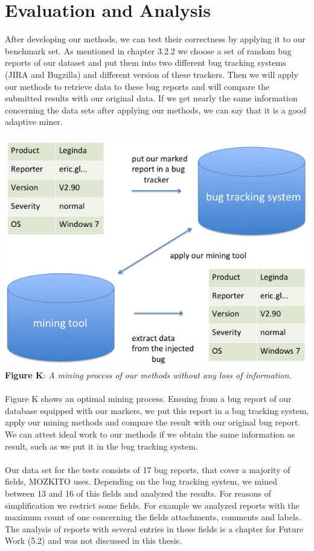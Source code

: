 \chapter{Evaluation and Analysis}
\label{Evaluation and Analysis}
After developing our methods, we can test their correctness by applying it to our benchmark set. As mentioned in chapter 3.2.2 we choose a set of random bug reports of our dataset and put them into two different bug tracking systems (JIRA and Bugzilla) and different version of these trackers. Then we will apply our methods to retrieve data to these bug reports and will compare the submitted results with our original data. If we get nearly the same information concerning the data sets after applying our methods, we can say that it is a good adaptive miner. \\ \\\includegraphics[width=1.0\textwidth]{Folie2.jpg}  \\\textbf{Figure K}: \textit{A mining process of our methods without any loss of information.}  \\ \\
Figure K shows an optimal mining process. Ensuing from a bug report of our database equipped with our markers, we put this report in a bug tracking system, apply our mining methods and compare the result with our original bug report. We can attest ideal work to our methods if we obtain the same information as result, such as we put it in the bug tracking system. \\ \\
Our data set for the tests consists of 17 bug reports, that cover a majority of fields, MOZKITO uses. Depending on the bug tracking system, we mined between 13 and 16 of this fields and analyzed the results. For reasons of simplification we restrict some fields. For example we analyzed reports with the maximum count of one concerning the fields attachments, comments and labels. The analysis of reports with several entries in these fields is a chapter for Future Work (5.2) and was not discussed in this thesis.
